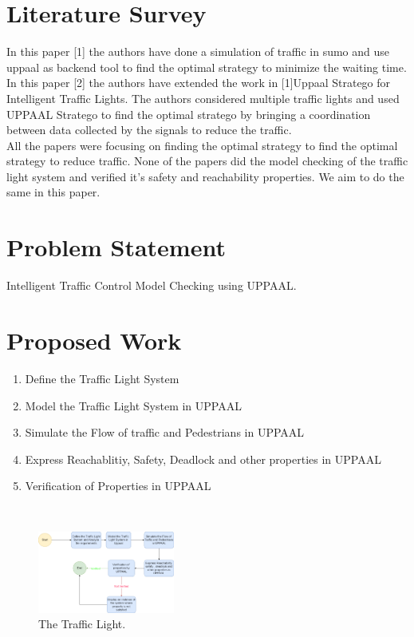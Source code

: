 \documentclass[conference]{IEEEtran}
\begin{document}
\section{Literature Survey}

In this paper [1] the authors have done a simulation of traffic in sumo and use uppaal as backend tool to find the optimal strategy to minimize the waiting time.  
\\

In this paper [2] the authors have extended the work in [1]Uppaal Stratego for Intelligent Traffic Lights. The authors considered multiple traffic lights and used UPPAAL Stratego to find the optimal stratego by bringing a coordination between data collected by the signals to reduce the traffic.
\\

All the papers were focusing on finding the optimal strategy to find the optimal strategy to reduce traffic. None of the papers did the model checking of the traffic light system and verified it’s safety and reachability properties. We aim to do the same in this paper.

\section{Problem Statement}

Intelligent Traffic Control Model Checking using UPPAAL. 

\section{Proposed Work}
\begin{enumerate}
    \item Define the Traffic Light System
    \item Model the Traffic Light System in UPPAAL
    \item Simulate the Flow of traffic and Pedestrians in UPPAAL
    \item Express Reachablitiy, Safety, Deadlock and other properties in UPPAAL
    \item Verification of Properties in UPPAAL
    
\end{enumerate}
\\
\begin{figure}[H]
    \centering
    \includegraphics[width=0.4\textwidth]{FlowChart.drawio.png}
    \caption{The Traffic Light.}
\end{figure}
\end{document}
